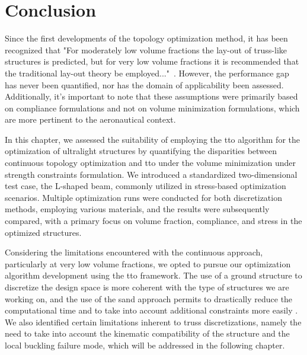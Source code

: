 \section{Conclusion}
Since the first developments of the topology optimization method, it has been recognized that "For moderately low volume fractions the lay-out of truss-like structures is predicted, but for very low volume fractions it is recommended that the traditional lay-out theory be employed..."~. However, the performance gap has never been quantified, nor has the domain of applicability been assessed. Additionally, it's important to note that these assumptions were primarily based on compliance formulations and not on volume minimization formulations, which are more pertinent to the aeronautical context.

In this chapter, we assessed the suitability of employing the \gls{tto} algorithm for the optimization of ultralight structures by quantifying the disparities between continuous topology optimization and \gls{tto} under the volume minimization under strength constraints formulation. We introduced a standardized two-dimensional test case, the L-shaped beam, commonly utilized in stress-based optimization scenarios. Multiple optimization runs were conducted for both discretization methods, employing various materials, and the results were subsequently compared, with a primary focus on volume fraction, compliance, and stress in the optimized structures.

Considering the limitations encountered with the continuous approach, particularly at very low volume fractions, we opted to pursue our optimization algorithm development using the \acrfull{tto} framework. The use of a ground structure to discretize the design space is more coherent with the type of structures we are working on, and the use of the \gls{sand} approach permits to drastically reduce the computational time and to take into account additional constraints more easily . We also identified certain limitations inherent to truss discretizations, namely the need to take into account the kinematic compatibility of the structure and the local buckling failure mode, which will be addressed in the following chapter.